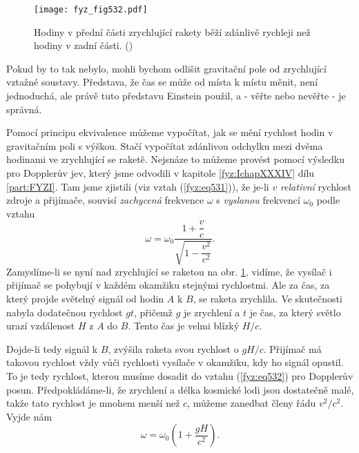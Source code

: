     \begin{figure}[ht!] %
      \centering
      \texttt{[image: fyz\_fig532.pdf]}
      \caption{Hodiny v přední části zrychlující rakety běží zdánlivě rychleji než hodiny v zadní 
               části. (\cite[s.~787]{Feynman02})}
      \label{fyz:fig532}
    \end{figure}
    
    Pokud by to tak nebylo, mohli bychom odlišit gravitační pole od zrychlující vztažné soustavy. 
    Představa, že čas se může od místa k místu měnit, není jednoduchá, ale právě tuto představu 
    Einstein použil, a - věřte nebo nevěřte - je správná.
    
    Pomocí principu ekvivalence můžeme vypočítat, jak se mění rychlost hodin v gravitačním poli s 
    výškou. Stačí vypočítat zdánlivou odchylku mezi dvěma hodinami ve zrychlující se raketě. 
    Nejsnáze to můžeme provést pomocí výsledku pro Dopplerův jev, který jsme odvodili v kapitole 
    \ref{fyz:IchapXXXIV} dílu \ref{part:FYZI}. Tam jsme zjistili (viz vztah (\ref{fyz:eq531})), že 
    je-li \(v\) \emph{relativní} rychlost zdroje a přijímače, souvisí \emph{zachycená} frekvence 
    \(\omega\) s \emph{vyslanou} frekvencí \(\omega_0\) podle vztahu
    \begin{equation}\label{fyz:eq532}
      \omega = \omega_0\dfrac{1+\dfrac{v}{c}}{\sqrt{1-\dfrac{v^2}{c^2}}}.
    \end{equation}
    Zamyslíme-li se nyní nad zrychlující se raketou na obr. \ref{fyz:fig532}, vidíme, že vysílač i 
    přijímač se pohybují v každém okamžiku stejnými rychlostmi. Ale za čas, za který projde 
    světelný signál od hodin \(A\) k \(B\), se raketa zrychlila. Ve skutečnosti nabyla dodatečnou 
    rychlost \(gt\), přičemž \(g\) je zrychlení a \(t\) je čas, za který světlo urazí vzdálenost 
    \(H\) z \(A\) do \(B\). Tento čas je velmi blízký \(H/c\). 
    
    Dojde-li tedy signál k \(B\), zvýšila raketa svou rychlost o \(gH/c\). Přijímač má takovou 
    rychlost vždy vůči rychlosti vysílače v okamžiku, kdy ho signál opustil. To je tedy rychlost, 
    kterou musíme dosadit do vztahu (\ref{fyz:eq532}) pro Dopplerův posun. Předpokládáme-li, že 
    zrychlení a délka kosmické lodi jsou dostatečně malé, takže tato rychlost je mnohem menší než 
    \(c\), můžeme zanedbat členy řádu \(v^2/c^2\). Vyjde nám
    \begin{equation}\label{fyz:eq533}
      \omega = \omega_0\left(1 + \dfrac{gH}{c^2}\right).
    \end{equation}
    
